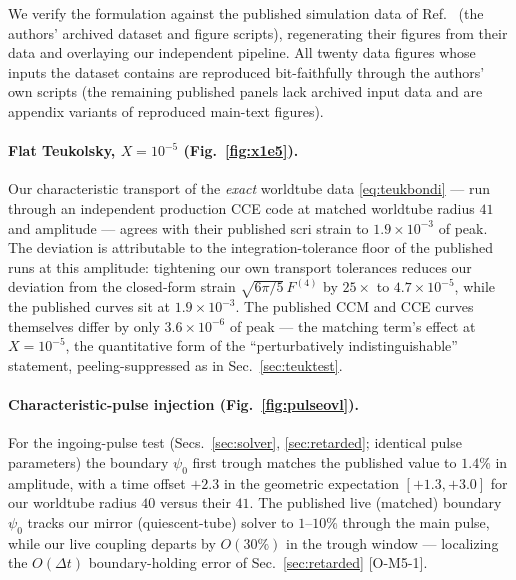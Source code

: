 \begin{nfblock}
We verify the formulation against the published simulation data of
Ref.~\cite{Ma:2023qjn} (the authors' archived dataset and figure
scripts), regenerating their figures from their data and overlaying our
independent pipeline. All twenty data figures whose inputs the dataset
contains are reproduced bit-faithfully through the authors' own scripts
(the remaining published panels lack archived input data and are
appendix variants of reproduced main-text figures).

\paragraph{Flat Teukolsky, $X=10^{-5}$ (Fig.~\ref{fig:x1e5}).}
Our characteristic transport of the \emph{exact} worldtube data
\eqref{eq:teukbondi} --- run through an independent production CCE code
\cite{Moxon:2020gha} at matched worldtube radius $41$ and amplitude ---
agrees with their published scri strain to $1.9\times10^{-3}$ of peak.
The deviation is attributable to the integration-tolerance floor of the
published runs at this amplitude: tightening our own transport
tolerances reduces our deviation from the closed-form strain
$\sqrt{6\pi/5}\,F^{(4)}$ by $25\times$ to $4.7\times10^{-5}$, while the
published curves sit at $1.9\times10^{-3}$. The published CCM and CCE
curves themselves differ by only $3.6\times10^{-6}$ of peak --- the
matching term's effect at $X=10^{-5}$, the quantitative form of the
``perturbatively indistinguishable'' statement, peeling-suppressed as in
Sec.~\ref{sec:teuktest}.

\paragraph{Characteristic-pulse injection (Fig.~\ref{fig:pulseovl}).}
For the ingoing-pulse test (Secs.~\ref{sec:solver},
\ref{sec:retarded}; identical pulse parameters) the boundary $\psi_0$
first trough matches the published value to $1.4\%$ in amplitude, with a
time offset $+2.3$ in the geometric expectation $[+1.3,+3.0]$ for our
worldtube radius $40$ versus their $41$. The published live (matched)
boundary $\psi_0$ tracks our mirror (quiescent-tube) solver to
$1$--$10\%$ through the main pulse, while our live coupling departs by
$O(30\%)$ in the trough window --- localizing the $O(\Delta t)$
boundary-holding error of Sec.~\ref{sec:retarded} [O-M5-1].


\end{nfblock}
